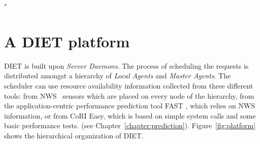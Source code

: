 "%

\chapter{A DIET platform}
\label{ch:description}

\textsc{DIET} is built upon \emph{Server Daemons}. The process of
scheduling the requests is distributed amongst a hierarchy of
\emph{Local Agents} and \emph{Master Agents}. The scheduler can use
resource availability information collected from three different tools:
from NWS~\cite{WSH99} sensors which are placed on every node of the hierarchy,
from the application-centric performance prediction tool \textsc{FAST}
\cite{Qui02}, which relies on NWS information,
or from CoRI Easy, which is based on simple system calls and some basic
performance tests. (see Chapter~\ref{chapter:prediction}).
Figure~\ref{fig:platform} shows the hierarchical organization of
DIET.

